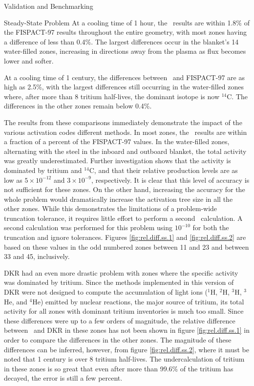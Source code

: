\begin{chapter}{Validation and Benchmarking\label{chap:valid}}
\begin{section}{Steady-State Problem}
    At a cooling time of 1 hour, the \ALARA\ results are within 1.8\%
    of the FISPACT-97 results throughout the entire geometry, with
    most zones having a difference of less than 0.4\%.  The largest
    differences occur in the blanket's 14 water-filled zones,
    increasing in directions away from the plasma as flux becomes
    lower and softer.
    \enlargethispage*{\baselineskip}
    
    At a cooling time of 1 century, the differences between \ALARA\ 
    and FISPACT-97 are as high as 2.5\%, with the largest differences
    still occurring in the water-filled zones where, after more than 8
    tritium half-lives, the dominant isotope is now $^{14}$C.  The
    differences in the other zones remain below 0.4\%.
    
    The results from these comparisons immediately demonstrate the
    impact of the various activation codes different methods.  In most
    zones, the \ALARA\ results are within a fraction of a percent of
    the FISPACT-97 values.  In the water-filled zones, alternating
    with the steel in the inboard and outboard blanket, the total
    activity was greatly underestimated.  Further investigation shows
    that the activity is dominated by tritium and $^{14}$C, and that
    their relative production levels are as low as $5 \times 10^{-12}$
    and $3 \times 10^{-9}$, respectively.  It is clear that this level
    of accuracy is not sufficient for these zones.  On the other hand,
    increasing the accuracy for the whole problem would dramatically
    increase the activation tree size in all the other zones.  While
    this demonstrates the limitations of a problem-wide truncation
    tolerance, it requires little effort to perform a second \ALARA\ 
    calculation.  A second calculation was performed for this problem
    using $10^{-10}$ for both the truncation and ignore tolerances.
    Figures \ref{fig:rel.diff.ss.1} and \ref{fig:rel.diff.ss.2} are
    based on these values in the odd numbered zones between 11 and 23
    and between 33 and 45, inclusively.
    
    DKR had an even more drastic problem with zones where the specific
    activity was dominated by tritium.  Since the methods implemented
    in this version of DKR were not designed to compute the
    accumulation of light ions ($^1$H, $^2$H, $^3$H, $^3$He, and
    $^4$He) emitted by nuclear reactions, the major source of tritium,
    its total activity for all zones with dominant tritium inventories
    is much too small.  Since these differences were up to a few
    orders of magnitude, the relative difference between \ALARA\ and
    DKR in these zones has not been shown in figure
    \ref{fig:rel.diff.ss.1} in order to compare the differences in the
    other zones.  The magnitude of these differences can be inferred,
    however, from figure \ref{fig:rel.diff.ss.2}, where it must be
    noted that 1 century is over 8 tritium half-lives.  The
    undercalculation of tritium in these zones is so great that even
    after more than 99.6\% of the tritium has decayed, the error is
    still a few percent.
    

\end{section}
\end{chapter}
